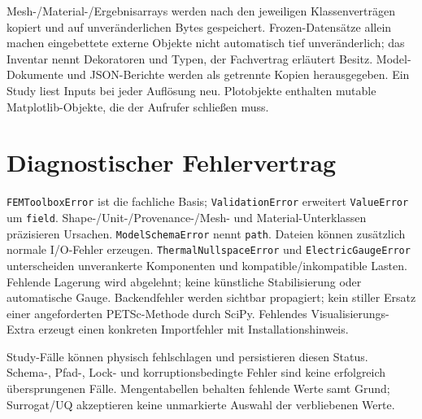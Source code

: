 Mesh-/Material-/Ergebnisarrays werden nach den jeweiligen Klassenverträgen
kopiert und auf unveränderlichen Bytes gespeichert. Frozen-Datensätze allein
machen eingebettete externe Objekte nicht automatisch tief unveränderlich;
das Inventar nennt Dekoratoren und Typen, der Fachvertrag erläutert Besitz.
Model-Dokumente und JSON-Berichte werden als getrennte Kopien herausgegeben.
Ein Study liest Inputs bei jeder Auflösung neu. Plotobjekte enthalten mutable
Matplotlib-Objekte, die der Aufrufer schließen muss.

\section{Diagnostischer Fehlervertrag}
\texttt{FEMToolboxError} ist die fachliche Basis; \texttt{ValidationError}
erweitert \texttt{ValueError} um \texttt{field}. Shape-/Unit-/Provenance-/Mesh-
und Material-Unterklassen präzisieren Ursachen. \texttt{ModelSchemaError}
nennt \texttt{path}. Dateien können zusätzlich normale I/O-Fehler erzeugen.
\texttt{ThermalNullspaceError} und \texttt{ElectricGaugeError} unterscheiden
unverankerte Komponenten und kompatible/inkompatible Lasten. Fehlende Lagerung
wird abgelehnt; keine künstliche Stabilisierung oder automatische Gauge.
Backendfehler werden sichtbar propagiert; kein stiller Ersatz einer angeforderten
PETSc-Methode durch SciPy. Fehlendes Visualisierungs-Extra erzeugt einen
konkreten Importfehler mit Installationshinweis.

Study-Fälle können physisch fehlschlagen und persistieren diesen Status.
Schema-, Pfad-, Lock- und korruptionsbedingte Fehler sind keine erfolgreich
übersprungenen Fälle. Mengentabellen behalten fehlende Werte samt Grund;
Surrogat/UQ akzeptieren keine unmarkierte Auswahl der verbliebenen Werte.
\endgroup
